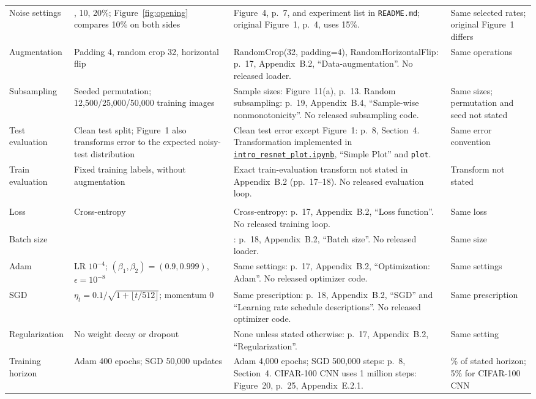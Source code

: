 \documentclass{article}
\begin{document}
\begin{longtable}{@{}>{\raggedright\arraybackslash}p{}>{\raggedright\arraybackslash}p{}>{\raggedright\arraybackslash}p{}>{\raggedright\arraybackslash}p{}@{}}
Noise settings & 0, 10, 20\%; Figure~\ref{fig:opening} compares 10\% on both sides & Figure~4, p.~7, and experiment list in \texttt{README.md}; original Figure~1, p.~4, uses 15\%. & Same selected rates; original Figure~1 differs\\
Augmentation & Padding 4, random crop 32, horizontal flip & RandomCrop(32, padding=4), RandomHorizontalFlip: p.~17, Appendix~B.2, ``Data-augmentation''. No released loader. & Same operations\\
Subsampling & Seeded permutation; 12,500/25,000/50,000 training images & Sample sizes: Figure~11(a), p.~13. Random subsampling: p.~19, Appendix~B.4, ``Sample-wise nonmonotonicity''. No released subsampling code. & Same sizes; permutation and seed not stated\\
Test evaluation & Clean test split; Figure~1 also transforms error to the expected noisy-test distribution & Clean test error except Figure~1: p.~8, Section~4. Transformation implemented in \href{https://gitlab.com/harvard-machine-learning/double-descent/-/blob/0d653296f870e6bf7ee82dc71b4f7b49d53fa85d/intro_resnet_plot.ipynb}{\texttt{intro\_resnet\_plot.ipynb}}, ``Simple Plot'' and \texttt{plot}. & Same error convention\\
Train evaluation & Fixed training labels, without augmentation & Exact train-evaluation transform not stated in Appendix~B.2 (pp.~17--18). No released evaluation loop. & Transform not stated\\
\midrule
\multicolumn{4}{l}{\textbf{Training}}\\
Loss & Cross-entropy & Cross-entropy: p.~17, Appendix~B.2, ``Loss function''. No released training loop. & Same loss\\
Batch size & 128 & 128: p.~18, Appendix~B.2, ``Batch size''. No released loader. & Same size\\
Adam & LR $10^{-4}$; $(\beta_1,\beta_2)=(0.9,0.999)$, $\epsilon=10^{-8}$ & Same settings: p.~17, Appendix~B.2, ``Optimization: Adam''. No released optimizer code. & Same settings\\
SGD & $\eta_t=0.1/\sqrt{1+\lfloor t/512\rfloor}$; momentum 0 & Same prescription: p.~18, Appendix~B.2, ``SGD'' and ``Learning rate schedule descriptions''. No released optimizer code. & Same prescription\\
Regularization & No weight decay or dropout & None unless stated otherwise: p.~17, Appendix~B.2, ``Regularization''. & Same setting\\
Training horizon & Adam 400 epochs; SGD 50,000 updates & Adam 4,000 epochs; SGD 500,000 steps: p.~8, Section~4. CIFAR-100 CNN uses 1 million steps: Figure~20, p.~25, Appendix~E.2.1. & 10\% of stated horizon; 5\% for CIFAR-100 CNN\\

\end{longtable}
\end{document}
